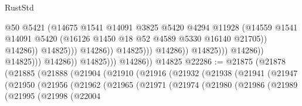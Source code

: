\begin{lexlean}{RustStd}
\begin{coremodule}
                                                        @50
                                                        @5421
                                                        (@14675
                                                          @1541
                                                          @14091
                                                          @3825
                                                          @5420
                                                          @4294
                                                          @11928
                                                          (@14559
                                                            @1541
                                                            @14091
                                                            @5420
                                                            (@16126
                                                              @1450
                                                              @18
                                                              @52
                                                              @4589
                                                              @5330
                                                              @16140
                                                              @21705))
                                                          @14286))
                                                      @14825)))
                                                @14286))
                                            @14825)))
                                      @14286))
                                  @14825)))
                            @14286))
                        @14825)))
                  @14286))
              @14825)))
        @14286))
    @14825
@22286 := @21875
    (@21878
      (@21885
        (@21888
          (@21904
            (@21910
              (@21916
                (@21932
                  (@21938
                    (@21941
                      (@21947
                        (@21950
                          (@21956
                            (@21962
                              (@21965
                                (@21971
                                  (@21974
                                    (@21980
                                      (@21986
                                        (@21989
                                          (@21995
                                            (@21998
                                              (@22004

\end{coremodule}
\end{lexlean}
